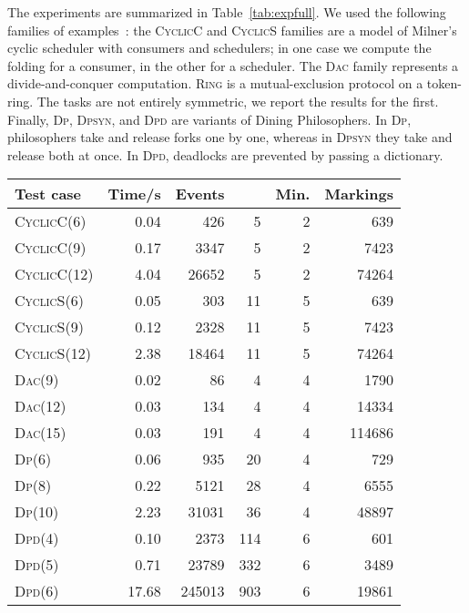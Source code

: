 \documentclass{llncs}
\begin{document}
The experiments are summarized in Table~\ref{tab:expfull}. We used
the following families of examples~\cite{Cor96}:
the \textsc{CyclicC} and \textsc{CyclicS} families are a model of
Milner's cyclic scheduler with  consumers and  schedulers; in
one case we compute the folding for a consumer, in the other for a scheduler.
The \textsc{Dac} family represents a divide-and-conquer computation.
\textsc{Ring} is a mutual-exclusion protocol on a token-ring. The tasks
are not entirely symmetric, we report the results for the first.
Finally, \textsc{Dp}, \textsc{Dpsyn}, and \textsc{Dpd} are variants of
Dining Philosophers. In \textsc{Dp},
philosophers take and release forks one by one, whereas in \textsc{Dpsyn}
they take and release both at once. In \textsc{Dpd}, 
deadlocks are prevented by passing a dictionary.

\begin{table}[ht]
\begin{center}
\setlength\tabcolsep{5pt}
\begin{tabular}{lrrrrr}
\midrule
Test case & Time/s & Events &  & Min. & Markings \\
\toprule
\textsc{CyclicC}(6)  &  0.04  &   426 & 5 & 2 &    639 \\
\textsc{CyclicC}(9)  &  0.17  &  3347 & 5 & 2 &   7423 \\
\textsc{CyclicC}(12) &  4.04  & 26652 & 5 & 2 &  74264 \\
\midrule
\textsc{CyclicS}(6)  & 0.05 &   303 & 11 & 5 &    639 \\
\textsc{CyclicS}(9)  & 0.12 &  2328 & 11 & 5 &   7423 \\
\textsc{CyclicS}(12) & 2.38 & 18464 & 11 & 5 &  74264 \\
\midrule
\textsc{Dac}(9)  & 0.02 &  86 & 4 & 4 &   1790 \\
\textsc{Dac}(12) & 0.03 & 134 & 4 & 4 &  14334 \\
\textsc{Dac}(15) & 0.03 & 191 & 4 & 4 & 114686 \\
\midrule
\textsc{Dp}(6)  & 0.06 &    935 & 20 & 4 &   729 \\
\textsc{Dp}(8)  & 0.22 &   5121 & 28 & 4 &  6555 \\
\textsc{Dp}(10) & 2.23 &  31031 & 36 & 4 & 48897 \\
\midrule
\textsc{Dpd}(4) &  0.10 &   2373 & 114 & 6 &    601 \\
\textsc{Dpd}(5) &  0.71 &  23789 & 332 & 6 &   3489 \\
\textsc{Dpd}(6) & 17.68 & 245013 & 903 & 6 &  19861 \\

\end{tabular}
\end{center}
\end{table}
\end{document}
